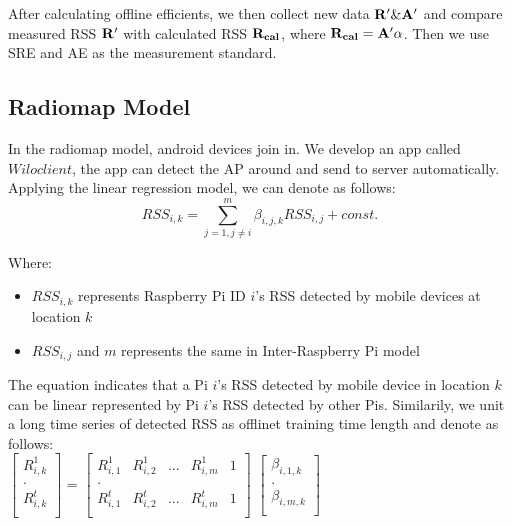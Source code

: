 \documentclass[10pt,conference]{IEEEtran}
\begin{document}
After calculating offline efficients, we then collect new data $\bold{R' \& A'}$ and compare measured RSS $\bold{R'}$ with calculated RSS $\bold{R_{cal}}$, where $\bold{R_{cal}=A'\alpha}$. Then we use SRE and AE as the measurement standard.


\subsection{Radiomap Model}

In the radiomap model, android devices join in. We develop an app called $\textit{Wiloclient}$, the app can detect the AP around and send to server automatically. Applying the linear regression model, we can denote as follows:
$$RSS_{i,k}=\sum_{j=1,j\neq i}^m\beta_{i,j,k}RSS_{i,j}+const.$$

Where:
\begin{itemize}
	\item $RSS_{i,k}$ represents Raspberry Pi ID $i$'s RSS detected by mobile devices at location $k$
	\item $RSS_{i,j}$ and $m$ represents the same in Inter-Raspberry Pi model
\end{itemize}

The equation indicates that a Pi $i$'s RSS detected by mobile device in location $k$ can be linear represented by Pi $i$'s RSS detected by other Pis. Similarily, we unit a long time series of detected RSS as offlinet training time length and denote as follows: \\

$\begin{bmatrix}
R_{i,k}^1 \\
. \\
R_{i,k}^t  \\
\end{bmatrix}$ = 
$\begin{bmatrix}
R_{i,1}^1 & R_{i,2}^1 & ... & R_{i,m}^1 & 1 \\
. \\
R_{i,1}^t & R_{i,2}^t & ... & R_{i,m}^t & 1 \\
\end{bmatrix}$  
$\begin{bmatrix}
\beta_{i,1,k} \\
. \\
\beta_{i,m,k} \\
\end{bmatrix}$  \\
\end{document}
